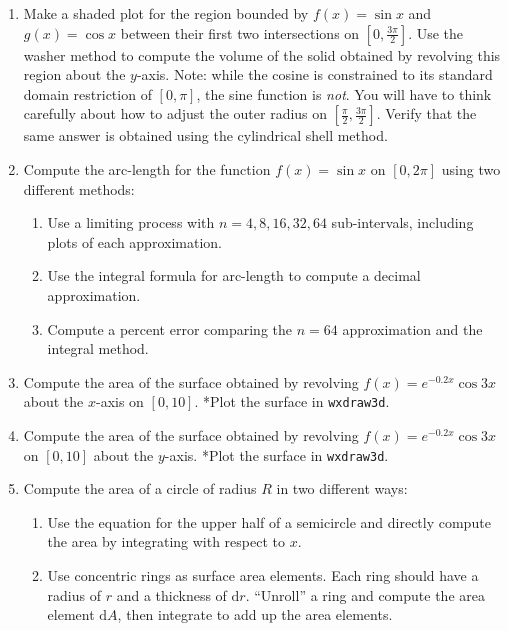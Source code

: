 \documentclass[10.5pt,twoside]{report}
\theoremstyle{definition}
\begin{document}
\begin{enumerate}
\item Make a shaded plot for the region bounded by $f(x)=\sin{x}$ and $g(x)=\cos{x}$ between their first two intersections on $[0,\frac{3\pi}{2}]$.  Use the washer method to compute the volume of the solid obtained by revolving this region about the $y$-axis.  Note: while the cosine is constrained to its standard domain restriction of $[0,\pi]$, the sine function is \textit{not}.  You will have to think carefully about how to adjust the outer radius on $[\frac{\pi}{2},\frac{3\pi}{2}]$.  Verify that the same answer is obtained using the cylindrical shell method.

\item Compute the arc-length for the function $f(x)=\sin{x}$ on $[0,2\pi]$ using two different methods:
 \begin{enumerate}
  \item Use a limiting process with $n=4,8,16,32,64$ sub-intervals, including plots of each approximation.  
  \item Use the integral formula for arc-length to compute a decimal approximation.
  \item Compute a percent error comparing the $n=64$ approximation and the integral method.
 \end{enumerate}

\item Compute the area of the surface obtained by revolving $f(x)=e^{-0.2x}\cos{3x}$ about the $x$-axis on $[0,10]$.  *Plot the surface in \verb|wxdraw3d|.

\item Compute the area of the surface obtained by revolving $f(x)=e^{-0.2x}\cos{3x}$ on $[0,10]$ about the $y$-axis.  *Plot the surface in \verb|wxdraw3d|.

\item Compute the area of a circle of radius $R$ in two different ways:
\begin{enumerate}
\item Use the equation for the upper half of a semicircle and directly compute the area by integrating with respect to $x$.
\item Use concentric rings as surface area elements.  Each ring should have a radius of $r$ and a thickness of $\mathrm{d}r$.  ``Unroll'' a ring and compute the area element $\mathrm{d}A$, then integrate to add up the area elements.
\end{enumerate}


\end{enumerate}
\end{document}
